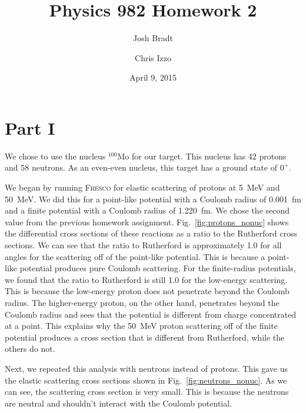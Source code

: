 \documentclass[aps, prc, twocolumn, reprint]{revtex4-1}
\newcommand{\nuc}[2]{${}^{#1}\text{#2}$}
\newcommand{\fresco}[0]{\textsc{Fresco}\xspace}
\begin{document}
\title{Physics 982 Homework 2}
\author{Josh Bradt}
\author{Chris Izzo}
\date{April 9, 2015}




\maketitle

\section*{Part I}

	We chose to use the nucleus \nuc{100}{Mo} for our target. This nucleus has 42 protons and 58 neutrons. As an even-even nucleus, this target has a ground state of $0^+$.

	We began by running \fresco for elastic scattering of protons at \SI{5}{MeV} and \SI{50}{MeV}. We did this for a point-like potential with a Coulomb radius of \SI{0.001}{fm} and a finite potential with a Coulomb radius of \SI{1.220}{fm}. We chose the second value from the previous homework assignment. Fig.~\ref{fig:protons_nonuc} shows the differential cross sections of these reactions as a ratio to the Rutherford cross sections. We can see that the ratio to Rutherford is approximately 1.0 for all angles for the scattering off of the point-like potential. This is because a point-like potential produces pure Coulomb scattering. For the finite-radius potentials, we found that the ratio to Rutherford is still 1.0 for the low-energy scattering. This is because the low-energy proton does not penetrate beyond the Coulomb radius. The higher-energy proton, on the other hand, penetrates beyond the Coulomb radius and sees that the potential is different from charge concentrated at a point. This explains why the \SI{50}{MeV} proton scattering off of the finite potential produces a cross section that is different from Rutherford, while the others do not.

	Next, we repeated this analysis with neutrons instead of protons. This gave us the elastic scattering cross sections shown in Fig.~\ref{fig:neutrons_nonuc}. As we can see, the scattering cross section is very small. This is because the neutrons are neutral and shouldn't interact with the Coulomb potential. 
\end{document}
